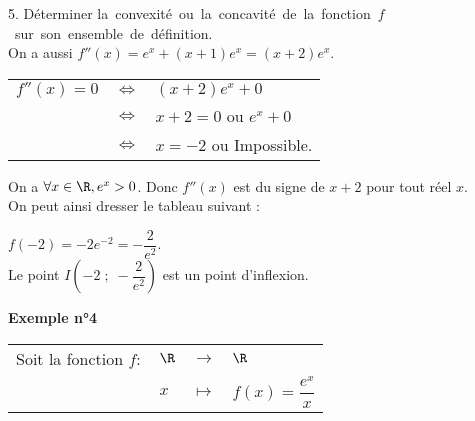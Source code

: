 5. Déterminer \hbox{la convexité ou la concavité de la fonction $f$ sur son ensemble de définition.} \\

On a aussi $f''(x) = e^x + \left(x+1\right)e^x = \left(x+2\right)e^x$. \\

\begin{tabular}{lll}
\hspace*{-.3cm} $f''(x) = 0$ & $\Longleftrightarrow$ & $\left(x+2\right)e^x + 0$ \\
& $\Longleftrightarrow$ & $x+2 = 0$ ou $e^x + 0$ \\
& $\Longleftrightarrow$ & $x = -2$ ou Impossible. \\
\end{tabular}

\vspace*{.3cm}

On a $\forall x \in \R, e^x > 0$. Donc $f''(x)$ est du signe de $x+2$ pour tout réel $x$. \\

On peut ainsi dresser le tableau suivant : \\


\vspace*{.3cm}

$f(-2) = -2e^{-2} = -\dfrac{2}{e^2}$. \\

Le point $I\left(-2 \; ; \; -\dfrac{2}{e^2}\right)$ est un point d'inflexion.

\vspace*{-5cm}

\newpage

\textbf{Exemple n°4} \\

\begin{tabular}{llll}
\hspace*{-.3cm} Soit la fonction $f:$ & $\R$ & $\longrightarrow$ & $\R$ \\
& $x$ & $\longmapsto$ & $f\left(x\right) = \dfrac{e^x}{x}$ \\
\end{tabular}


